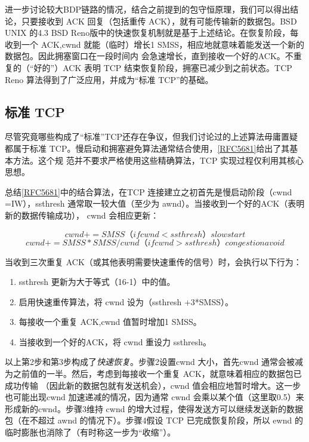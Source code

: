 进一步讨论较大BDP链路的情况，结合之前提到的包守恒原理，我们可以得出结论，只要接收到 ACK 回复（包括重传 ACK），就有可能传输新的数据包。BSD UNIX 的4.3 BSD
Reno版中的快速恢复机制就是基于上述结论。在恢复阶段，每收到一个 ACK,cwnd 就能（临时）增长1 SMSS，相应地就意味着能发送一个新的数据包。因此拥塞窗口在一段时间内
会急速增长，直到接收一个好的ACK。不重复的（“好的”）ACK 表明 TCP 结束恢复阶段，拥塞已减少到之前状态。TCP Reno 算法得到了广泛应用，并成为“标准 TCP”的基础。

\subsection{标准 TCP}
尽管究竟哪些构成了“标准”TCP还存在争议，但我们讨论过的上述算法毋庸置疑都属于标准 TCP。慢启动和拥塞避免算法通常结合使用，\href{https://www.rfc-editor.org/rfc/rfc5681}{[RFC5681]}给出了其基本方法。这个规
范并不要求严格使用这些精确算法，TCP 实现过程仅利用其核心思想。

总结\href{https://www.rfc-editor.org/rfc/rfc5681}{[RFC5681]}中的结合算法，在TCP 连接建立之初首先是慢启动阶段（cwnd =IW），ssthresh 通常取一较大值（至少为 awnd）。当接收到一个好的ACK（表明新的数据传输成功），
cwnd 会相应更新：

\begin{equation}
    cwnd += SMSS（if cwnd < ssthresh）slow start
\end{equation}
\begin{equation}
    cwnd += SMSS*SMSS/cwnd（if cwnd>ssthresh）congestion avoid
\end{equation}

当收到三次重复 ACK（或其他表明需要快速重传的信号）时，会执行以下行为：
\begin{enumerate}
    \item ssthresh 更新为大于等式（16-1）中的值。
    \item 启用快速重传算法，将 cwnd 设为（ssthresh +3*SMSS）。
    \item 每接收一个重复 ACK,cwnd 值暂时增加1 SMSS。
    \item 当接收到一个好的ACK，将 cwnd 重设力 ssthresh。
\end{enumerate}

以上第2步和第3步构成了\emph{快速恢复}。步骤2设置cwnd 大小，首先cwnd 通常会被减为之前值的一半。然后，考虑到每接收一个重复 ACK，就意味着相应的数据包已成功传输
（因此新的数据包就有发送机会），cwnd 值会相应地暂时增大。这一步也可能出现cwnd 加速递减的情况，因为通常 cwnd 会乘以某个值（这里取0.5）来形成新的cwnd。步骤3维持
cwnd 的增大过程，使得发送方可以继续发送新的数据包（在不超过 awnd 的情况下）。步骤4假设 TCP 已完成恢复阶段，所以 ewnd 的临时膨胀也消除了（有时称这一步为“收缩”）。

